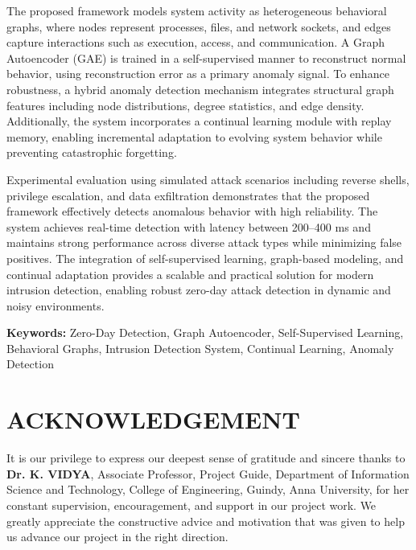 \documentclass[12pt,a4paper]{report}
\numberwithin{algorithm}{chapter}
\begin{document}
\vspace{0.4cm}

The proposed framework models system activity as heterogeneous behavioral graphs, where nodes represent processes, files, and network sockets, and edges capture interactions such as execution, access, and communication. A Graph Autoencoder (GAE) is trained in a self-supervised manner to reconstruct normal behavior, using reconstruction error as a primary anomaly signal. To enhance robustness, a hybrid anomaly detection mechanism integrates structural graph features including node distributions, degree statistics, and edge density. Additionally, the system incorporates a continual learning module with replay memory, enabling incremental adaptation to evolving system behavior while preventing catastrophic forgetting.

\vspace{0.4cm}

Experimental evaluation using simulated attack scenarios including reverse shells, privilege escalation, and data exfiltration demonstrates that the proposed framework effectively detects anomalous behavior with high reliability. The system achieves real-time detection with latency between 200–400 ms and maintains strong performance across diverse attack types while minimizing false positives. The integration of self-supervised learning, graph-based modeling, and continual adaptation provides a scalable and practical solution for modern intrusion detection, enabling robust zero-day attack detection in dynamic and noisy environments.

\vspace{0.5cm}
\noindent
\textbf{Keywords:} Zero-Day Detection, Graph Autoencoder, Self-Supervised Learning, Behavioral Graphs, Intrusion Detection System, Continual Learning, Anomaly Detection


\chapter*{ACKNOWLEDGEMENT}
\justifying

It is our privilege to express our deepest sense of gratitude and sincere thanks to \textbf{Dr. K. VIDYA}, Associate Professor, Project Guide, Department of Information Science and Technology, College of Engineering, Guindy, Anna University, for her constant supervision, encouragement, and support in our project work. We greatly appreciate the constructive advice and motivation that was given to help us advance our project in the right direction.
\end{document}
